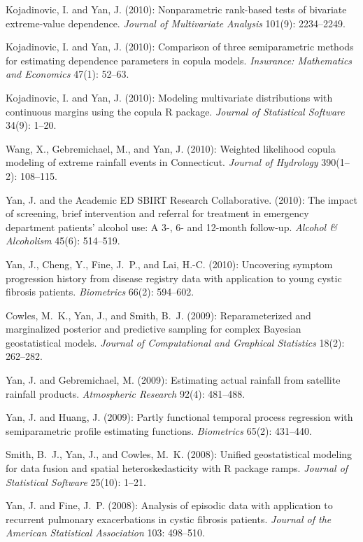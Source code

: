 \documentclass[Statistics]{vita}
\begin{document}
\begin{vita}
\begin{Publications}
\begin{RefereedJournalArticles}
  \item Kojadinovic, I. and Yan, J. (2010): Nonparametric rank-based tests of bivariate extreme-value dependence. {\em Journal of Multivariate Analysis\/} 101(9): 2234--2249.
  \item Kojadinovic, I. and Yan, J. (2010): Comparison of three semiparametric methods for estimating dependence parameters in copula models. {\em Insurance: Mathematics and Economics\/} 47(1): 52--63.
  \item Kojadinovic, I. and Yan, J. (2010): Modeling multivariate distributions with continuous margins using the copula R package. {\em Journal of Statistical Software\/} 34(9): 1--20.
  \item *Wang, X., Gebremichael, M., and Yan, J. (2010): Weighted likelihood copula modeling of extreme rainfall events in Connecticut. {\em Journal of Hydrology\/} 390(1--2): 108--115.
  \item Yan, J. and the Academic ED SBIRT Research Collaborative. (2010): The impact of screening, brief intervention and referral for treatment in emergency department patients' alcohol use: A 3-, 6- and 12-month follow-up. {\em Alcohol \& Alcoholism\/} 45(6): 514--519.
  \item Yan, J., Cheng, Y., Fine, J.~P., and Lai, H.-C. (2010): Uncovering symptom progression history from disease registry data with application to young cystic fibrosis patients. {\em Biometrics\/} 66(2): 594--602.
  \item Cowles, M.~K., Yan, J., and Smith, B.~J. (2009): Reparameterized and marginalized posterior and predictive sampling for complex Bayesian geostatistical models. {\em Journal of Computational and Graphical Statistics\/} 18(2): 262--282.
  \item Yan, J. and Gebremichael, M. (2009): Estimating actual rainfall from satellite rainfall products. {\em Atmospheric Research\/} 92(4): 481--488.
  \item Yan, J. and Huang, J. (2009): Partly functional temporal process regression with semiparametric profile estimating functions. {\em Biometrics\/} 65(2): 431--440.
  \item Smith, B.~J., Yan, J., and Cowles, M.~K. (2008): Unified geostatistical modeling for data fusion and spatial heteroskedasticity with R package ramps. {\em Journal of Statistical Software\/} 25(10): 1--21.
  \item Yan, J. and Fine, J.~P. (2008): Analysis of episodic data with application to recurrent pulmonary exacerbations in cystic fibrosis patients. {\em Journal of the American Statistical Association\/}  103: 498--510.

\end{RefereedJournalArticles}
\end{Publications}
\end{vita}
\end{document}
